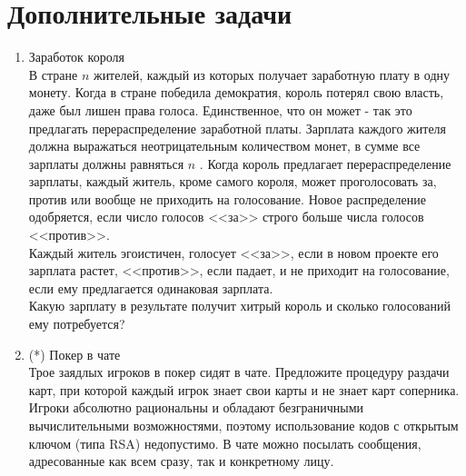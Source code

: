 \documentclass[pdftex,12pt,a4paper]{article}
\begin{document}
\section{Дополнительные задачи}

\begin{enumerate}


\item Заработок короля\\
В стране  $n$  жителей, каждый из которых получает заработную плату в одну монету. Когда в стране победила демократия, король потерял свою власть, даже был лишен права голоса. Единственное, что он может - так это предлагать перераспределение заработной платы. Зарплата каждого жителя должна выражаться неотрицательным количеством монет, в сумме все зарплаты должны равняться  $n$ . Когда король предлагает перераспределение зарплаты, каждый житель, кроме самого короля, может проголосовать за, против или вообще не приходить на голосование. Новое распределение одобряется, если число голосов <<за>> строго больше числа голосов <<против>>.\\
Каждый житель эгоистичен, голосует <<за>>, если в новом проекте его зарплата растет, <<против>>, если падает, и не приходит на голосование, если ему предлагается одинаковая зарплата.\\
Какую зарплату в результате получит хитрый король и сколько голосований ему потребуется?

\item (*) Покер в чате\\
Трое заядлых игроков в покер сидят в чате. Предложите процедуру раздачи карт, при которой каждый игрок знает свои карты и не знает карт соперника. Игроки абсолютно рациональны и обладают безграничными вычислительными возможностями, поэтому использование кодов с открытым ключом (типа RSA) недопустимо. В чате можно посылать сообщения, адресованные как всем сразу, так и конкретному лицу.


\end{enumerate}
\end{document}

